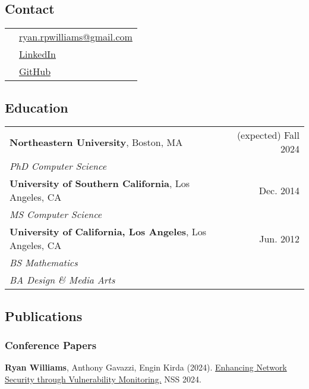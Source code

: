 \documentclass[11pt]{article}
\begin{document}

\subsection{Contact}
\label{sec:contact}

\begin{tabularx}{\textwidth}{ll}
    & \href{mailto:ryan.rpwilliams@gmail.com}{ryan.rpwilliams@gmail.com} \\
    & \href{https://www.linkedin.com/in/ryan-paul-williams}{LinkedIn} \\
    & \href{https://github.com/williamsryan}{GitHub} \\
\end{tabularx}

\subsection{Education}
\label{sec:education}

\begin{tabularx}{\textwidth}{>{\raggedright\arraybackslash}p{8cm}>{\raggedright\arraybackslash}r}
    \textbf{Northeastern University}, Boston, MA & (expected) Fall 2024 \\
    \textit{PhD Computer Science} & \\
    \textbf{University of Southern California}, Los Angeles, CA & Dec. 2014 \\
    \textit{MS Computer Science} & \\
    \textbf{University of California, Los Angeles}, Los Angeles, CA & Jun. 2012 \\
    \textit{BS Mathematics} & \\
    \textit{BA Design \& Media Arts} & \\
\end{tabularx}

\subsection{Publications}
\label{sec:publications}
\subsubsection{Conference Papers}
\textbf{Ryan Williams}, Anthony Gavazzi, Engin Kirda (2024).
\href{h#}{Enhancing Network Security through Vulnerability Monitoring.}
NSS 2024.
\end{document}
